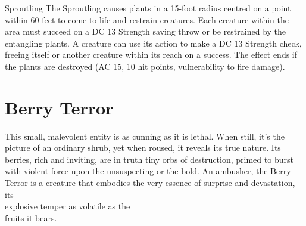 \begin{DndMonster}[width=0.5\textwidth]{Sproutling}
	The Sproutling causes plants in a 15-foot radius centred on a point within 60 feet to come to life and restrain creatures. Each creature within the area must succeed on a DC 13 Strength saving throw or be restrained by the entangling plants. A creature can use its action to make a DC 13 Strength check, freeing itself or another creature within its reach on a success. The effect ends if the plants are destroyed (AC 15, 10 hit points, vulnerability to fire damage).
      
\end{DndMonster}
\vfill\eject
\section*{Berry Terror}\label{sec:BerryTerror}
This small, malevolent entity is as cunning as it is lethal. When still, it's the picture of an ordinary shrub, yet when roused, it reveals its true nature. Its berries, rich and inviting, are in truth tiny orbs of destruction, primed to burst with violent force upon the unsuspecting or the bold. An ambusher, the Berry Terror is a creature that embodies the very essence of surprise and devastation, its\\explosive temper as volatile as the\\fruits it bears.
